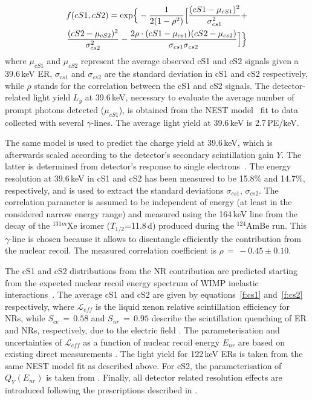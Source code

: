 {\begin{multline}
	f(cS1,cS2)  = {\rm exp} \Big\{ -\frac{1}{2(1-\rho^2)} \Big[ \frac{(cS1 - \mu_{cS1})^2}{\sigma_{cs1}^2} + \\ 
	 \frac{(cS2 - \mu_{cS2})^2}{\sigma_{cs2}^2} - \frac{2\rho\cdot(cS1 - \mu_{cs1}) (cS2 - \mu_{cs2})} {\sigma_{cs1}\sigma_{cs2}} \Big] \Big\}
\label{f:2dgaus}
\end{multline}
where $\mu_{cS1}$ and $\mu_{cS2}$ 
represent the average observed cS1 and cS2 signals given a 39.6\,keV ER, $\sigma_{cs1}$ and $\sigma_{cs2}$ are the standard deviation in cS1 and cS2 respectively,
while $\rho$ stands for the correlation between the cS1 and cS2 signals. The detector-related light yield $L_y$  at 39.6\,keV, necessary to evaluate the average number of prompt photons detected 
($\mu_{cS1}$), is obtained from the NEST model~\cite{NEST,Geant1,Geant2} fit to data collected with several $\gamma$-lines.  The average light yield at 39.6\,keV is 2.7\,PE/keV.

The same model is used to predict the charge yield at 39.6\,keV, which is afterwards scaled according to the detector's secondary scintillation gain $Y$. 
 The latter is determined from detector's response to single electrons~\cite{SingleE}.
The energy resolution at 39.6\,keV in cS1 and cS2 has been measured to be 15.8\% and 14.7\%, respectively, and is used to extract the standard 
deviations $\sigma_{cs1}$, $\sigma_{cs2}$.  The correlation parameter is assumed to be independent of energy (at least in the considered narrow energy range) and measured
using the 164\,keV line from the decay of the $^{131m}$Xe isomer ($T_{1/2}$=11.8\,d) produced during the  $^{124}$AmBe run. This $\gamma$-line is chosen because it allows to disentangle efficiently the contribution from the nuclear recoil. The measured correlation coefficient is $\rho \, = \, -0.45 \pm 0.10$. 


The cS1 and cS2 distributions from the NR contribution are predicted starting from the expected nuclear recoil energy spectrum
of WIMP inelastic interactions~\cite{Baudis:2013bba}. The average cS1 and cS2 are given by equations~\ref{f:cs1} and~\ref{f:cs2} respectively,
where $\mathcal{L}_{eff}$ is the liquid xenon relative scintillation efficiency for NRs, while $S_{ee} \, = \, 0.58$  and $S_{nr} \, = \, 0.95$ describe the scintillation 
quenching  of ER and NRs, respectively, due to the electric field \cite{ScintQuenching}. The parameterisation and uncertainties of $\mathcal{L}_{eff}$ as a function of nuclear recoil energy $E_{nr}$ are based on existing 
direct measurements \cite{run8Result}. The light yield for 122\,keV ERs is taken from the same NEST model fit as described above. For cS2, the parameterisation 
of $Q_{Y}(E_{nr})$ is taken from \cite{QY}. Finally, all detector related resolution effects are introduced following the prescriptions described in \cite{Aprile:2012vw}.

}
